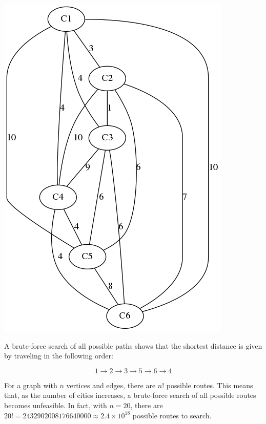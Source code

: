 \documentclass[a4paper]{article}
\begin{document}
\begin{center}\includegraphics[scale=0.25]{graph.png}\end{center}

A brute-force search of all possible paths shows that the shortest distance is given by traveling in the following order: 

\[1 \to 2 \to 3 \to 5 \to 6 \to 4\]

For a graph with $n$ vertices and edges, there are $n!$ possible routes. This means that, as the number of cities increases, a brute-force search of all possible routes becomes unfeasible. In fact, with $n=20$, there are $20!=2432902008176640000\approx2.4\times10^{18}$ possible routes to search. 
\end{document}
